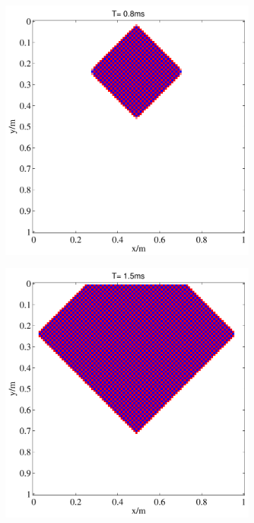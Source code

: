 \begin{figure}[ht!]
\centering
    \begin{subfigure}[b]{0.45\textwidth}
        \centering
        \includegraphics[width=\textwidth]{figures/courandt_1.pdf}
        \caption{}
    \end{subfigure}
    \hfill
    \begin{subfigure}[b]{0.45\textwidth}
        \centering
        \includegraphics[width=\textwidth]{figures/courandt_2.pdf}

\end{subfigure}
\end{figure}
